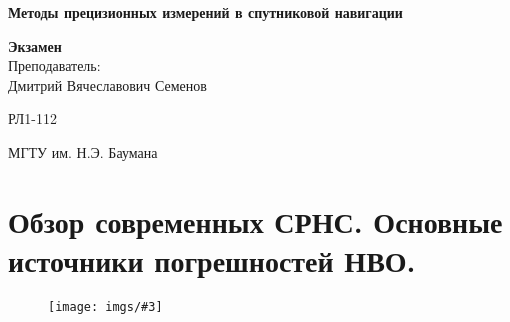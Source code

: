 \documentclass[14pt,a4paper,oneside]{extarticle}
\newcommand{\pic}[3]{
	\begin{figure}[#1]
		\begin{center}
			\texttt{[image: imgs/\#3]}
		\end{center}
	\end{figure}
}
\begin{document}



\begin{titlepage}
    \begin{center}
        \vspace*{1cm}

        \Huge
        \textbf{Методы прецизионных измерений в спутниковой навигации}
        \vspace{1.5cm}

        \vfill
        \Huge
        \textbf{Экзамен}\\
        \vspace{0.5cm}
        \LARGE
        Преподаватель:\\Дмитрий Вячеславович Семенов

        \vspace{1.5cm}

        \vfill

        \LARGE
        РЛ1-112

        \vspace{0.8cm}


        \Large
        МГТУ им. Н.Э. Баумана

    \end{center}
\end{titlepage}

\tableofcontents

\section{Обзор современных СРНС. Основные источники погрешностей НВО.}

\pic{H}{\textwidth}{1}
\end{document}
